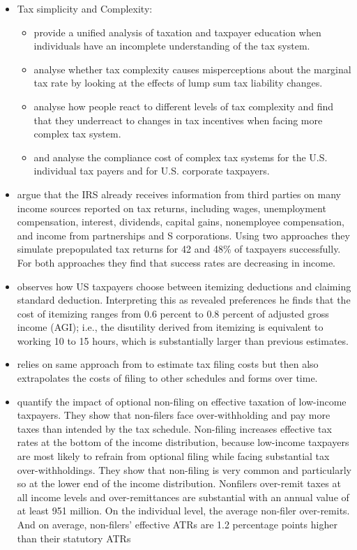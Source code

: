 \documentclass[12pt]{article}
\begin{document}
\begin{itemize}
    \item Tax simplicity and Complexity: 
    \begin{itemize}
        \item \textcite{craig2024tax} provide a unified analysis of taxation and taxpayer education when individuals have an incomplete understanding of the tax system.
        \item \textcite{feldman2016taxpayer} analyse whether tax complexity causes misperceptions about the marginal tax rate by looking at the effects of lump sum tax liability changes. 
        \item \textcite{abeler2015complex} analyse how people react to different levels of tax complexity and find that they underreact to changes in tax incentives when facing more complex tax system. 
        \item \textcite{blumenthal1992compliance} and \textcite{slemrod2005etiology} analyse the compliance cost of complex tax systems for the U.S. individual tax payers and \textcite{zwick2021costs} for U.S. corporate taxpayers. 
    \end{itemize}
    \item \textcite{goodman2023automated} argue that the IRS already receives information from third parties on many income sources reported on tax returns, including wages, unemployment compensation, interest, dividends, capital gains, nonemployee compensation, and income from partnerships and S corporations. Using two approaches they simulate prepopulated tax returns for 42 and 48\% of taxpayers successfully. For both approaches they find that success rates are decreasing in income. 
    \item \textcite{benzarti2020taxing} observes how US taxpayers choose between itemizing deductions and claiming standard deduction. Interpreting this as revealed preferences he finds that the cost of itemizing ranges from 0.6 percent to 0.8 percent of adjusted gross income (AGI); i.e., the disutility derived from itemizing is equivalent to working 10 to 15 hours, which is substantially larger than previous estimates.
    \item \textcite{benzarti2021estimating} relies on same approach from \textcite{benzarti2020taxing} to estimate tax filing costs but then also extrapolates the costs of filing to other schedules and forms over time. 
    \item \textcite{hauck2024optional} quantify the impact of optional non-filing on effective taxation of low-income taxpayers. They show that non-filers face over-withholding and pay more taxes than intended by the tax schedule. Non-filing increases effective tax rates at the bottom of the income distribution, because low-income taxpayers are most likely to refrain from optional filing while facing substantial tax over-withholdings. They show that non-filing is very common and particularly so at the lower end of the income distribution. Nonfilers over-remit taxes at all income levels and over-remittances are substantial with an annual value of at least 951 million. On the individual level, the average non-filer over-remits. And on average, non-filers’ effective ATRs are 1.2 percentage points higher than their statutory ATRs

\end{itemize}
\end{document}
